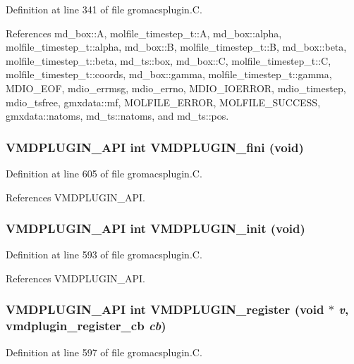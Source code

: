 Definition at line 341 of file gromacsplugin.C.

References md\_\-box::A, molfile\_\-timestep\_\-t::A, md\_\-box::alpha, molfile\_\-timestep\_\-t::alpha, md\_\-box::B, molfile\_\-timestep\_\-t::B, md\_\-box::beta, molfile\_\-timestep\_\-t::beta, md\_\-ts::box, md\_\-box::C, molfile\_\-timestep\_\-t::C, molfile\_\-timestep\_\-t::coords, md\_\-box::gamma, molfile\_\-timestep\_\-t::gamma, MDIO\_\-EOF, mdio\_\-errmsg, mdio\_\-errno, MDIO\_\-IOERROR, mdio\_\-timestep, mdio\_\-tsfree, gmxdata::mf, MOLFILE\_\-ERROR, MOLFILE\_\-SUCCESS, gmxdata::natoms, md\_\-ts::natoms, and md\_\-ts::pos.
\subsubsection{\setlength{\rightskip}{0pt plus 5cm}VMDPLUGIN\_\-API int VMDPLUGIN\_\-fini (void)}\label{gromacsplugin_8C_a23}




Definition at line 605 of file gromacsplugin.C.

References VMDPLUGIN\_\-API.
\subsubsection{\setlength{\rightskip}{0pt plus 5cm}VMDPLUGIN\_\-API int VMDPLUGIN\_\-init (void)}\label{gromacsplugin_8C_a21}




Definition at line 593 of file gromacsplugin.C.

References VMDPLUGIN\_\-API.
\subsubsection{\setlength{\rightskip}{0pt plus 5cm}VMDPLUGIN\_\-API int VMDPLUGIN\_\-register (void $\ast$ {\em v}, {\bf vmdplugin\_\-register\_\-cb} {\em cb})}\label{gromacsplugin_8C_a22}




Definition at line 597 of file gromacsplugin.C.

